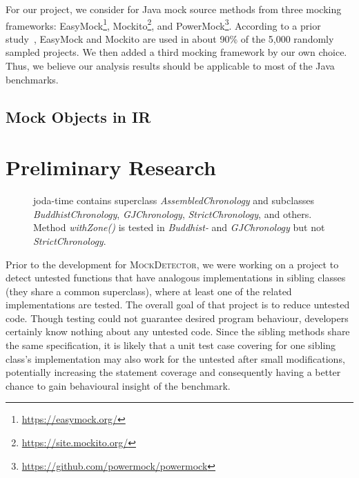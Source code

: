 For our project, we consider for Java mock source methods from three mocking frameworks: EasyMock\footnote{\url{https://easymock.org/}}, Mockito\footnote{\url{https://site.mockito.org/}}, and PowerMock\footnote{\url{https://github.com/powermock/powermock}}. According to a prior study~\cite{mostafa14:_empirical_study_mock_frameworks}, EasyMock and Mockito are used in about 90\% of the 5,000 randomly sampled projects. We then added a third mocking framework by our own choice. Thus, we believe our analysis results should be applicable to most of the Java benchmarks. 

\subsection{Mock Objects in IR} 


\section{Preliminary Research}

\begin{figure}[h]
	\centering
	
	\caption[Caption for SiblingClass untested method.]{joda-time contains superclass \textit{AssembledChronology} and subclasses \textit{BuddhistChronology}, \textit{GJChronology}, \textit{StrictChronology}, and others. Method \textit{withZone()} is tested in \textit{Buddhist-} and \textit{GJChronology} but not \textit{StrictChronology}.\footnotemark}
	\label{fig:hierarchyView}
\end{figure}


Prior to the development for \textsc{MockDetector}, we were working on a project to detect untested functions that have analogous implementations in sibling classes (they share a common superclass), where at least one of the related implementations are tested. The overall goal of that project is to reduce untested code. Though testing could not guarantee desired program behaviour, developers certainly know nothing about any untested code. Since the sibling methods share the same specification, it is likely that a unit test case covering for one sibling class's implementation may also work for the untested after small modifications, potentially increasing the statement coverage and consequently having a better chance to gain behavioural insight of the benchmark.


